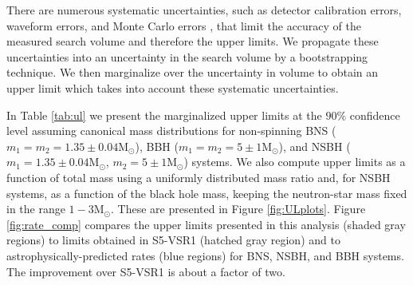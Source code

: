 \documentclass[prd,superscriptaddress,showpacs,amssymb,amsmath,amsfonts,aps,altaffilletter,nofootinbib,letterpaper,twocolumn]{revtex4}
\def\Msun{\ensuremath{\mathrm{M_{\odot}}}}
\def\sfive1yr{Collaboration:2009tt}
\def\sfivelvc{S5LowMassLV}
\begin{document}
There are numerous systematic uncertainties, such as detector
calibration errors, waveform errors, and Monte Carlo errors
\cite{\sfive1yr}, that limit the accuracy of the measured search volume
and therefore the upper limits. We propagate these uncertainties into an
uncertainty in the search volume by a bootstrapping technique.  We then
marginalize over the uncertainty in volume to obtain an upper limit
which takes into account these systematic uncertainties.




In Table \ref{tab:ul} we present the marginalized upper limits at the $90\%$
confidence level assuming canonical mass distributions for non-spinning
\ac{BNS} ($m_1 = m_2 = 1.35 \pm 0.04 \Msun$), \ac{BBH} ($m_1 = m_2 = 5 \pm 1
\Msun$), and \ac{NSBH} ($m_1 = 1.35 \pm 0.04 \Msun$, $m_2 = 5 \pm 1 \Msun$)
systems. We also compute upper limits as a function of total mass using a
uniformly distributed mass ratio and, for \ac{NSBH} systems, as a function of
the black hole mass, keeping the neutron-star mass fixed in the range
$1-3\Msun$. These are presented in Figure \ref{fig:ULplots}. Figure
\ref{fig:rate_comp} compares the upper limits presented in this analysis
(shaded gray regions) to limits obtained in S5-VSR1 (hatched gray region) and
to astrophysically-predicted rates (blue regions) for \ac{BNS}, \ac{NSBH}, and
\ac{BBH} systems. The improvement over S5-VSR1 is about a factor of
two.
\end{document}
